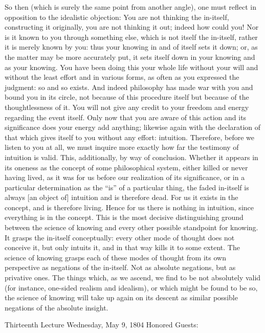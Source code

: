 So then (which is surely the same point from another angle),
one must reflect in opposition
to the idealistic objection:
You are not thinking the in-itself,
constructing it originally,
you are not thinking it out;
indeed how could you!
Nor is it known to you through something else,
which is not itself the in-itself,
rather it is merely known by you:
thus your knowing in and of itself sets it down;
or, as the matter may be more accurately put,
it sets itself down in your knowing
and as your knowing.
You have been doing this your whole life
without your will
and without the least effort
and in various forms,
as often as you expressed the judgment:
so and so exists.
And indeed philosophy has made war with you
and bound you in its circle,
not because of this procedure itself
but because of the thoughtlessness of it.
You will not give any credit to
your freedom and energy regarding the event itself.
Only now that you are aware of
this action and its significance
does your energy add anything;
likewise again with the declaration
of that which gives itself to you without any effort:
intuition.
Therefore, before we listen to you at all,
we must inquire more exactly
how far the testimony of intuition is valid.
This, additionally, by way of conclusion.
Whether it appears in its oneness
as the concept of some philosophical system,
either killed or never having lived,
as it was for us before
our realization of its significance,
or in a particular determination
as the “is” of a particular thing,
the faded in-itself is always [an object of] intuition
and is therefore dead.
For us it exists in the concept,
and is therefore living.
Hence for us there is nothing in intuition,
since everything is in the concept.
This is the most decisive distinguishing ground
between the science of knowing
and every other possible standpoint for knowing.
It grasps the in-itself conceptually:
every other mode of thought does not
conceive it, but only intuits it,
and in that way kills it to some extent.
The science of knowing grasps
each of these modes of thought
from its own perspective
as negations of the in-itself.
Not as absolute negations,
but as privative ones.
The things which, as we ascend,
we find to be not absolutely valid
(for instance, one-sided realism and idealism),
or which might be found to be so,
the science of knowing will take up again
on its descent as similar possible negations
of the absolute insight.

Thirteenth Lecture
Wednesday, May 9, 1804
Honored Guests:

